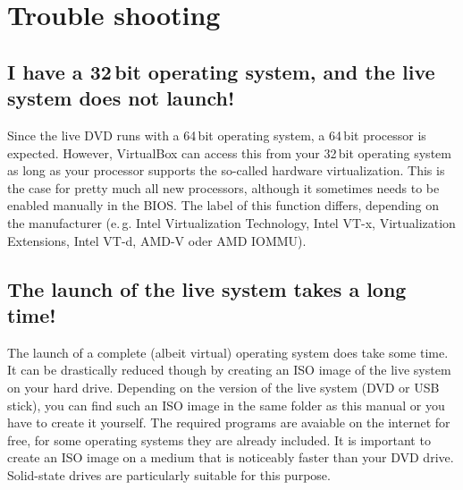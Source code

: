 \documentclass[a4paper,10pt,BCOR=0mm,DIV=14]{scrartcl}
\begin{document}
\section{Trouble shooting}
\subsection{I have a 32\,bit operating system, and the live system does not launch!}
Since the live DVD runs with a 64\,bit operating system, a 64\,bit processor is expected. However, VirtualBox can access this from your 32\,bit operating system as long as your processor supports the so-called hardware virtualization. This is the case for pretty much all new processors, although it sometimes needs to be enabled manually in the BIOS. The label of this function differs, depending on the manufacturer (e.\,g. Intel Virtualization Technology, Intel VT-x, Virtualization Extensions, Intel VT-d, AMD-V oder AMD IOMMU). 


\subsection{The launch of the live system takes a long time!}
The launch of a complete (albeit virtual) operating system does take some time. It can be drastically reduced though by creating an ISO image of the live system on your hard drive. Depending on the version of the live system (DVD or USB stick), you can find such an ISO image in the same folder as this manual or you have to create it yourself. The required programs are avaiable on the internet for free, for some operating systems they are already included. It is important to create an ISO image on a medium that is noticeably faster than your DVD drive. Solid-state drives are particularly suitable for this purpose. 
\end{document}
